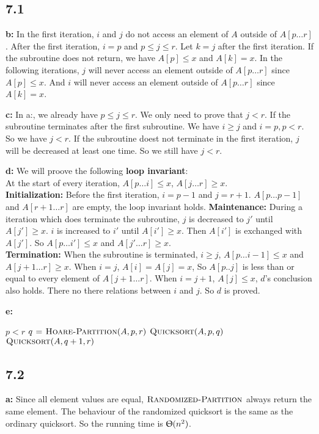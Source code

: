 \documentclass{book}
\begin{document}
\begin{CJK}{UTF8}{gkai}
\subsection*{7.1}
\textbf{b:} In the first iteration, $i$ and $j$ do not access an element of $A$ 
outside of $A[p\dots r]$. After the first iteration, $i=p$ and $p\le j \le r$.  
Let $k = j$ after the first iteration. If the subroutine does not return, we 
have $A[p] \le x$ and $A[k] = x$. In the following iterations, $j$ will never 
access an element outside of $A[p\dots r]$ since $A[p] \le x$. And $i$ will 
never access an element outside of $A[p\dots r]$ since $A[k] =x $.

\textbf{c:} In a:, we already have $p\le j \le r$. We only need to prove that $j 
< r$. If the subroutine terminates after the first subroutine. We have $i\ge j$ 
and $i = p, p < r$. So we have $j < r$. If the subroutine doest not terminate in 
the first iteration, $j$ will be decreased at least one time. So we still have 
$j < r$.

\textbf{d:} We will proove the following \textbf{loop invariant}: \\
At the start of every iteration, $A[p\dots i] \le x$, $A[j\dots r] \ge x$.\\
\textbf{Initialization:} Before the first iteration, $i = p-1$ and $j=r+1$.  
$A[p\dots p-1]$ and $A[r+1\dots r]$ are empty, the loop invariant holds.
\textbf{Maintenance:} During a iteration which does terminate the subroutine, 
$j$ is decreased to $j'$ until $A[j'] \ge x$. $i$ is increased to $i'$ until 
$A[i'] \ge x$. Then $A[i']$ is exchanged with $A[j']$. So $A[p\dots i'] \le x$ 
and $A[j'\dots r] \ge x$. \\
\textbf{Termination:} When the subroutine is terminated, $i \ge j$, $A[p\dots 
i-1] \le x$ and $A[j+1\dots r] \ge x$. When $i=j$, $A[i] = A[j] = x$, So 
$A[p..j]$ is less than or equal to every element of $A[j+1\dots r]$. When $i = 
j+1$, $A[j] \le x$, $d$'s conclusion also holds. There no there relations 
between $i$ and $j$. So $d$ is proved.
 
\textbf{e:}
\begin{codebox}
\li \If $p < r$
\li \Then $q \mathrel{\hspace{1pt}=\hspace{1pt}} \textnormal{\scshape Hoare-Partition}(A,p,r)$
\li $\textnormal{\scshape Quicksort}(A,p,q)$
\li $\textnormal{\scshape Quicksort}(A,q+1,r)$
\End
\end{codebox}

\subsection*{7.2} \textbf{a:} Since all element values are equal, 
$\textnormal{\scshape Randomized-Partition}$ always return the same element. The behaviour of 
the randomized quicksort is the same as the ordinary quicksort. So the running 
time is $\Uptheta(n^2)$.


\end{CJK}
\end{document}
